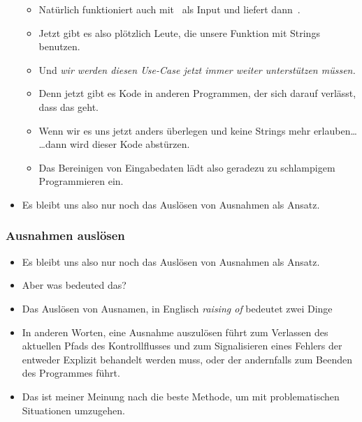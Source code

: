 \documentclass[aspectratio=169,mathserif,notheorems]{beamer}%
\begin{document}
\begin{frame}[t]
\begin{itemize}
{\begin{enumerate}
{{\begin{itemize}
\item<18-> Natürlich funktioniert  auch mit~ als Input und liefert dann~.%
\item<19-> Jetzt gibt es also plötzlich Leute, die unsere Funktion mit Strings benutzen.%
\item<20-> Und \emph{wir werden diesen Use-Case jetzt immer weiter unterstützen müssen.}%
\item<21-> Denn jetzt gibt es Kode in anderen Programmen, der sich darauf verlässt, dass das geht.%
\item<22-> Wenn wir es uns jetzt anders überlegen und keine Strings mehr erlauben{\dots} {\dots}dann wird dieser Kode abstürzen.%
\item<23-> Das Bereinigen von Eingabedaten lädt also geradezu zu schlampigem Programmieren ein.%
\end{itemize}%
}}%
\end{enumerate}}%
%
\item<24-> Es bleibt uns also nur noch das Auslösen von Ausnahmen als Ansatz.%
\end{itemize}%
\end{frame}%
%
\begin{frame}%
\frametitle{Ausnahmen auslösen}%
\begin{itemize}%
\item Es bleibt uns also nur noch das Auslösen von Ausnahmen als Ansatz.%
%
\item<2-> Aber was bedeuted das?%
%
\item<3-> Das Auslösen von Ausnamen, in Englisch \emph{raising of } bedeutet zwei Dinge%
%
\item<8-> In anderen Worten, eine Ausnahme auszulösen führt zum Verlassen des aktuellen Pfads des Kontrollflusses und zum Signalisieren eines Fehlers der entweder Explizit behandelt werden muss, oder der andernfalls zum Beenden des Programmes führt.%
%
\item<9-> Das ist meiner Meinung nach die beste Methode, um mit problematischen Situationen umzugehen.%
\end{itemize}%
\end{frame}%
\end{document}
